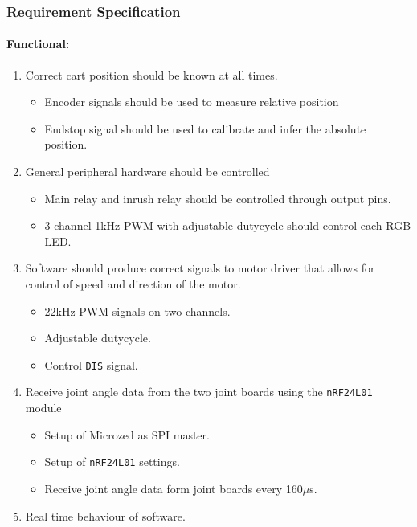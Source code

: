 \subsubsection{Requirement Specification} %
\label{ssub:controller_requirements}

\paragraph{Functional:}
\begin{enumerate}[resume]
	\item Correct cart position should be known at all times.
	\begin{itemize}
		\item Encoder signals should be used to measure relative position
		\item Endstop signal should be used to calibrate and infer the absolute position.
	\end{itemize}
	\item General peripheral hardware should be controlled
	\begin{itemize}
		\item Main relay and inrush relay should be controlled through output pins.
		\item 3 channel 1kHz PWM with adjustable dutycycle should control each RGB LED.
	\end{itemize}
	\item Software should produce correct signals to motor driver that allows for control of speed and direction of the motor.
	\begin{itemize}
		\item 22kHz PWM signals on two channels.
		\item Adjustable dutycycle.
		\item Control \texttt{DIS} signal.
 	\end{itemize}
	\item Receive joint angle data from the two joint boards using the \texttt{nRF24L01} module
	\begin{itemize}
		\item Setup of Microzed as SPI master.
		\item Setup of \texttt{nRF24L01} settings.
		\item Receive joint angle data form joint boards every 160$\mu$s.
	\end{itemize}
	\item Real time behaviour of software.
\end{enumerate}

